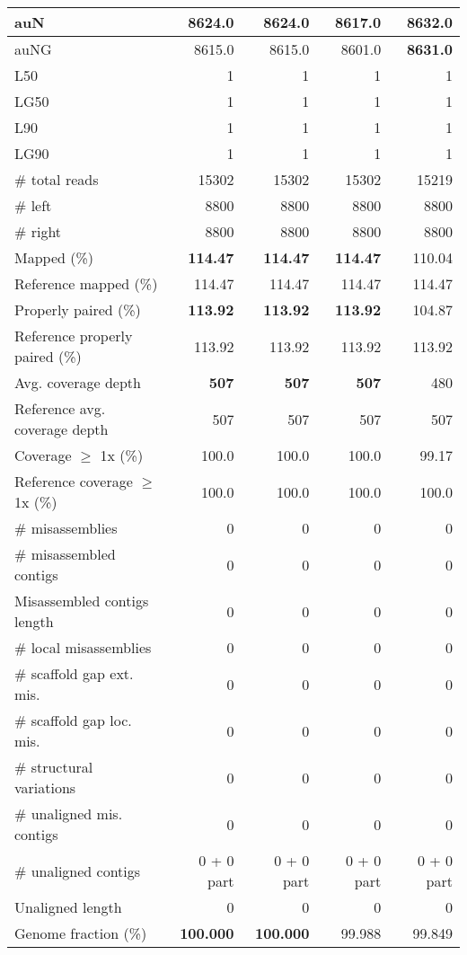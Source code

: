 \documentclass[12pt,a4paper]{article}
\begin{document}
\begin{table}[ht]
\begin{center}
\begin{tabular}{|l*{4}{|r}|}
auN & 8624.0 & 8624.0 & 8617.0 & {\bf 8632.0} \\ \hline
auNG & 8615.0 & 8615.0 & 8601.0 & {\bf 8631.0} \\ \hline
L50 & 1 & 1 & 1 & 1 \\ \hline
LG50 & 1 & 1 & 1 & 1 \\ \hline
L90 & 1 & 1 & 1 & 1 \\ \hline
LG90 & 1 & 1 & 1 & 1 \\ \hline
\# total reads & 15302 & 15302 & 15302 & 15219 \\ \hline
\# left & 8800 & 8800 & 8800 & 8800 \\ \hline
\# right & 8800 & 8800 & 8800 & 8800 \\ \hline
Mapped (\%) & {\bf 114.47} & {\bf 114.47} & {\bf 114.47} & 110.04 \\ \hline
Reference mapped (\%) & 114.47 & 114.47 & 114.47 & 114.47 \\ \hline
Properly paired (\%) & {\bf 113.92} & {\bf 113.92} & {\bf 113.92} & 104.87 \\ \hline
Reference properly paired (\%) & 113.92 & 113.92 & 113.92 & 113.92 \\ \hline
Avg. coverage depth & {\bf 507} & {\bf 507} & {\bf 507} & 480 \\ \hline
Reference avg. coverage depth & 507 & 507 & 507 & 507 \\ \hline
Coverage $\geq$ 1x (\%) & 100.0 & 100.0 & 100.0 & 99.17 \\ \hline
Reference coverage $\geq$ 1x (\%) & 100.0 & 100.0 & 100.0 & 100.0 \\ \hline
\# misassemblies & 0 & 0 & 0 & 0 \\ \hline
\# misassembled contigs & 0 & 0 & 0 & 0 \\ \hline
Misassembled contigs length & 0 & 0 & 0 & 0 \\ \hline
\# local misassemblies & 0 & 0 & 0 & 0 \\ \hline
\# scaffold gap ext. mis. & 0 & 0 & 0 & 0 \\ \hline
\# scaffold gap loc. mis. & 0 & 0 & 0 & 0 \\ \hline
\# structural variations & 0 & 0 & 0 & 0 \\ \hline
\# unaligned mis. contigs & 0 & 0 & 0 & 0 \\ \hline
\# unaligned contigs & 0 + 0 part & 0 + 0 part & 0 + 0 part & 0 + 0 part \\ \hline
Unaligned length & 0 & 0 & 0 & 0 \\ \hline
Genome fraction (\%) & {\bf 100.000} & {\bf 100.000} & 99.988 & 99.849 \\ \hline

\end{tabular}
\end{center}
\end{table}
\end{document}
